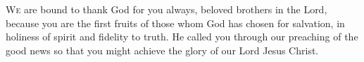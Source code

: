 \lettrine[lines=3,loversize=0.15]{W}{e} are bound to thank God for you always, beloved brothers in the Lord, because you are the first fruits of those whom God has chosen for salvation, in holiness of spirit and fidelity to truth. He called you through our preaching of the good news so that you might achieve the glory of our Lord Jesus Christ.
